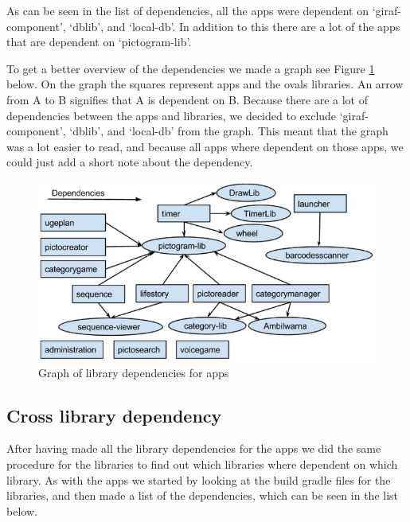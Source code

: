 As can be seen in the list of dependencies, all the apps were dependent on ‘giraf-component’, ‘dblib’, and ‘local-db’. In addition to this there are a lot of the apps that are dependent on ‘pictogram-lib’. 

To get a better overview of the dependencies we made a graph see Figure \ref{AppLibependencies} below. On the graph the squares represent apps and the ovals libraries. An arrow from A to B signifies that A is dependent on B. Because there are a lot of dependencies between the apps and libraries, we decided to exclude ‘giraf-component’, ‘dblib’, and ‘local-db’ from the graph. This meant that the graph was a lot easier to read, and because all apps where dependent on those apps, we could just add a short note about the dependency.


\begin{figure}[H]
	\centering
	\includegraphics[width=0.8 \textwidth]{pictures/AppLibependencies.png}
	\caption{Graph of library dependencies for apps}
	\label{AppLibependencies}
\end{figure}


\subsection{Cross library dependency}
After having made all the library dependencies for the apps we did the same procedure for the libraries to find out which libraries where dependent on which library. As with the apps we started by looking at the build gradle files for the libraries, and then made a list of the dependencies, which can be seen in the list below.

